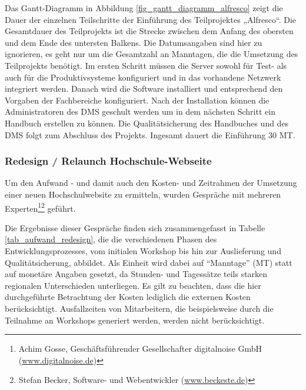 Das Gantt-Diagramm in Abbildung \ref{fig_gantt_diagramm_alfresco} zeigt die Dauer der einzelnen Teilschritte der Einführung des Teilprojektes „Alfresco“. Die Gesamtdauer des Teilprojekts ist die Strecke zwischen dem Anfang des obersten und dem Ende des untersten Balkens. Die Datumsangaben sind hier zu ignorieren, es geht nur um die Gesamtzahl an Manntagen, die die Umsetzung des Teilprojekts benötigt. Im ersten Schritt müssen die Server sowohl für Test- als auch für die Produktivsysteme konfiguriert und in das vorhandene Netzwerk integriert werden. Danach wird die Software installiert und entsprechend den Vorgaben der Fachbereiche konfiguriert. Nach der Installation können die Administratoren des DMS geschult werden um in dem nächsten Schritt ein Handbuch erstellen zu können. Die Qualitätsicherung des Handbuches und des DMS folgt zum Abschluss des Projekts. Ingesamt dauert die Einführung 30 MT.

\subsubsection{Redesign / Relaunch Hochschule-Webseite}
\label{subsubsection_redesign_webseite}
Um den Aufwand - und damit auch den Kosten- und Zeitrahmen der Umsetzung einer neuen Hochschulwebsite zu ermitteln, wurden Gespräche mit mehreren Experten\footnote{Achim Gosse, Geschäftsführender Gesellschafter digitalnoise GmbH (\url{www.digitalnoise.de})}\footnote{Stefan Becker, Software- und Webentwickler (\url{www.beckeste.de})} geführt.

Die Ergebnisse dieser Gespräche finden sich zusammengefasst in Tabelle \ref{tab_aufwand_redesign}, die die verschiedenen Phasen des Entwicklungsprozesses, vom initialen Workshop bis hin zur Auslieferung und Qualitätsicherung, abbildet. Als Einheit wird dabei auf “Manntage” (MT) statt auf monetäre Angaben gesetzt, da Stunden- und Tagessätze teils starken regionalen Unterschieden unterliegen. Es gilt zu beachten, dass die hier durchgeführte Betrachtung der Kosten lediglich die externen Kosten berücksichtigt. Ausfallzeiten von Mitarbeitern, die beispielsweise durch die Teilnahme an Workshops generiert werden, werden nicht berücksichtigt.

